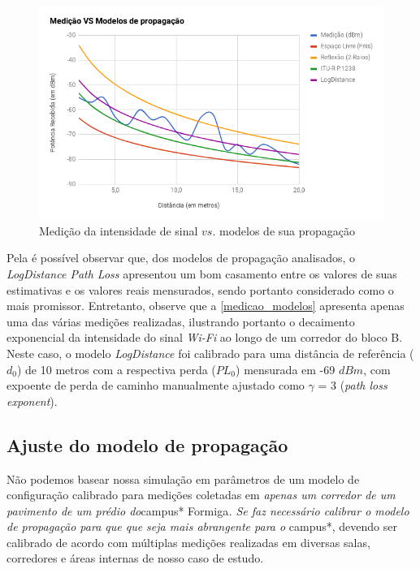 \documentclass[
	12pt,				%
	twoside,			%
	a4paper,			%
	english,			%
	french,				%
	spanish,			%
	brazil				%
	]{abntex2}
\begin{document}
\begin{figure}[htb]
    \caption{\label{medicao_modelos} Medição da intensidade de sinal $vs.$ modelos de sua propagação}
    \begin{center}
        \includegraphics[scale=0.68]{imagens/medicao-modelos.jpg}
    \end{center}
\end{figure}

Pela é possível observar que, dos modelos de propagação analisados, o
\emph{LogDistance Path Loss} apresentou um bom casamento entre os
valores de suas estimativas e os valores reais mensurados, sendo
portanto considerado como o mais promissor. Entretanto, observe que a
\autoref{medicao_modelos} apresenta apenas uma das várias medições
realizadas, ilustrando portanto o decaimento exponencial da intensidade
do sinal \emph{Wi-Fi} ao longo de um corredor do bloco B. Neste caso, o
modelo \emph{LogDistance} foi calibrado para uma distância de referência
(\(d_{0}\)) de 10 metros com a respectiva perda (\(PL_{0}\)) mensurada
em -69 \(dBm\), com expoente de perda de caminho manualmente ajustado
como \(\gamma\) = 3 (\emph{path loss exponent}).

\subsection{Ajuste do modelo de
propagação}\label{ajuste-do-modelo-de-propagauxe7uxe3o}

Não podemos basear nossa simulação em parâmetros de um modelo de
configuração calibrado para medições coletadas em \emph{apenas um
corredor de um pavimento de um prédio do}campus* Formiga\emph{. Se faz
necessário calibrar o modelo de propagação para que que seja mais
abrangente para o }campus*, devendo ser calibrado de acordo com
múltiplas medições realizadas em diversas salas, corredores e áreas
internas de nosso caso de estudo.
\end{document}
